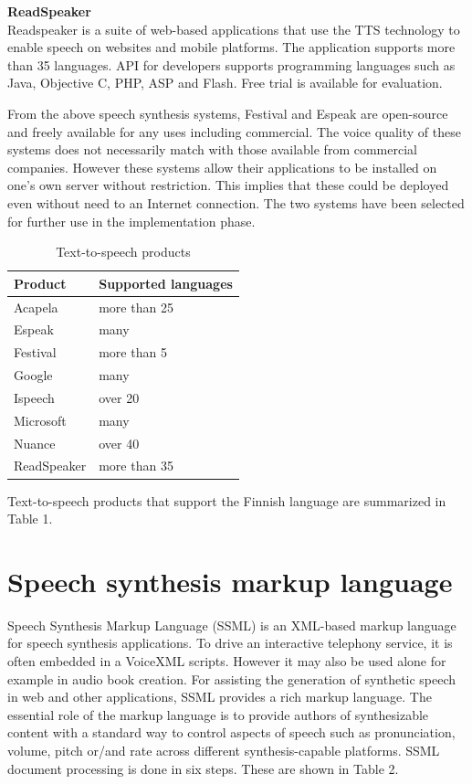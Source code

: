 \documentclass[11pt,a4paper,oneside,article]{memoir}
\begin{document}
\textbf{ReadSpeaker}\\
Readspeaker is a suite of web-based applications that use the TTS technology to enable speech on websites and mobile platforms. The application supports more than 35 languages. API for developers supports programming languages such as Java, Objective C, PHP, ASP and Flash. Free trial is available for evaluation. \cite{readspeaker}

From the above speech synthesis systems, Festival and Espeak are open-source and freely available for any uses including commercial. The voice quality of these systems does not necessarily match with those available from commercial companies. However these systems allow their applications to be installed on one's own server without restriction. This implies that these could be deployed even without need to an Internet connection. The two systems have been selected for further use in the implementation phase.\\



\begin{table}[h]

 \caption{Text-to-speech products}
    \begin{tabular}{ | l | l | }
    \hline
    \textbf{Product} & \textbf{Supported languages} \\ \hline
    Acapela & more than 25  \\ \hline
    Espeak &  many    \\ \hline
    Festival &  more than 5 \\ \hline
    Google &  many    \\ \hline
    Ispeech & over 20  \\ \hline
    Microsoft &  many   \\ \hline
    Nuance & over 40  \\ \hline
    ReadSpeaker & more than 35\\ \hline
    \end{tabular}

\end{table}

Text-to-speech products that support the Finnish language are summarized in Table 1.

\section{Speech synthesis markup language}
Speech Synthesis Markup Language (SSML) is an XML-based markup language for speech synthesis applications. To drive an interactive telephony service, it is often embedded in a VoiceXML scripts. However it may also be used alone for example in audio book creation. For assisting the generation of synthetic speech in web and other applications, SSML provides a rich markup language. The essential role of the markup language is to provide authors of synthesizable content with a standard way to control aspects of speech such as pronunciation, volume, pitch or/and rate across different synthesis-capable platforms. \cite{w3}
 SSML document processing is done in six steps. These are shown in Table 2.\\
\end{document}
